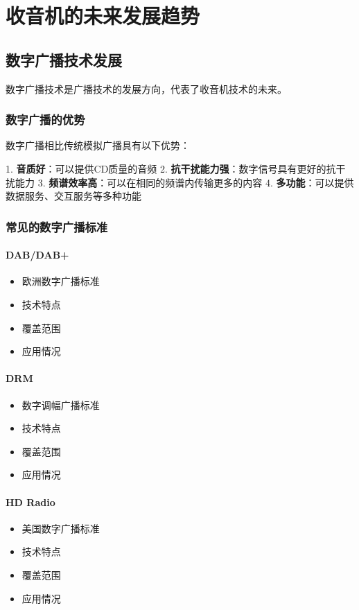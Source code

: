 \documentclass[12pt,UTF8]{ctexbook}
\begin{document}
\part{收音机的未来发展趋势}

\chapter{数字广播技术发展}

数字广播技术是广播技术的发展方向，代表了收音机技术的未来。

\section{数字广播的优势}

数字广播相比传统模拟广播具有以下优势：

1. \textbf{音质好}：可以提供CD质量的音频
2. \textbf{抗干扰能力强}：数字信号具有更好的抗干扰能力
3. \textbf{频谱效率高}：可以在相同的频谱内传输更多的内容
4. \textbf{多功能}：可以提供数据服务、交互服务等多种功能

\section{常见的数字广播标准}

\subsection{DAB/DAB+}\begin{itemize}
  \item 欧洲数字广播标准
  \item 技术特点
  \item 覆盖范围
  \item 应用情况\end{itemize}

\subsection{DRM}\begin{itemize}
  \item 数字调幅广播标准
  \item 技术特点
  \item 覆盖范围
  \item 应用情况\end{itemize}

\subsection{HD Radio}\begin{itemize}
  \item 美国数字广播标准
  \item 技术特点
  \item 覆盖范围
  \item 应用情况\end{itemize}
\end{document}
